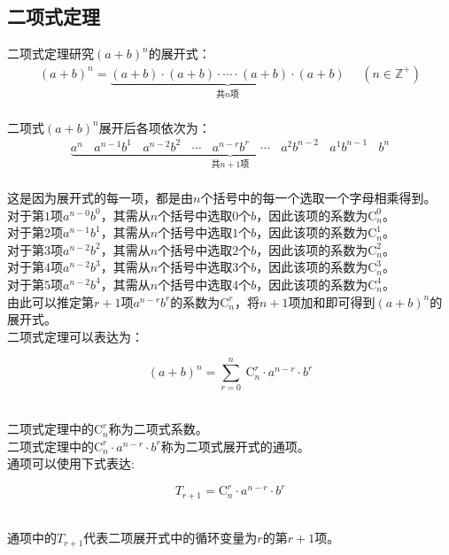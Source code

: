 \documentclass[UTF8]{ctexart}
\newcommand{\Co}{\mathrm{C}}
\begin{document}
\newpage

\subsection{二项式定理}
    \setcounter{equation}{0}
    二项式定理研究$(a+b)^n$的展开式：
    \begin{align}
        (a+b)^n=\underbrace{(a+b)\cdot(a+b)\cdot\cdots\cdot(a+b)\cdot(a+b)}_{\text{共}n\text{项}}~~~~~~(n\in\mathbb{Z^+})
    \end{align}\\
    二项式$(a+b)^n$展开后各项依次为：
    \begin{align}
        \underbrace{a^{n}~~~~a^{n-1}b^1~~~~a^{n-2}b^2~~~~\cdots~~~~a^{n-r}b^r~~~~\cdots~~~~a^2b^{n-2}~~~~a^1b^{n-1}~~~~b^{n}}_{\text{共}n+1\text{项}}
    \end{align}\\
    这是因为展开式的每一项，都是由$n$个括号中的每一个选取一个字母相乘得到。\\[3mm]
    对于第$1$项$a^{n-0}b^0$，其需从$n$个括号中选取$0$个$b$，因此该项的系数为$\Co_n^0$。\\[3mm]
    对于第$2$项$a^{n-1}b^1$，其需从$n$个括号中选取$1$个$b$，因此该项的系数为$\Co_n^1$。\\[3mm]
    对于第$3$项$a^{n-2}b^2$，其需从$n$个括号中选取$2$个$b$，因此该项的系数为$\Co_n^2$。\\[3mm]
    对于第$4$项$a^{n-2}b^3$，其需从$n$个括号中选取$3$个$b$，因此该项的系数为$\Co_n^3$。\\[3mm]
    对于第$5$项$a^{n-2}b^4$，其需从$n$个括号中选取$4$个$b$，因此该项的系数为$\Co_n^4$。\\[3mm]
    由此可以推定第$r+1$项$a^{n-r}b^r$的系数为$\Co_n^r$，将$n+1$项加和即可得到$(a+b)^n$的展开式。\\[8mm]
    二项式定理可以表达为：
    \begin{large}
        \begin{equation*}
            (a+b)^n=\sum_{r=0}^{n}~\Co_n^r\cdot a^{n-r}\cdot b^r
        \end{equation*}
    \end{large}\\
    二项式定理中的$\Co_n^r$称为二项式系数。\\[3mm]
    二项式定理中的$\Co_n^r\cdot a^{n-r}\cdot b^r$称为二项式展开式的通项。\\[10mm]
    通项可以使用下式表达:
    \begin{large}
        \begin{equation*}
            T_{r+1}=\Co_n^r\cdot a^{n-r}\cdot b^r
        \end{equation*}
    \end{large}\\
    通项中的$T_{r+1}$代表二项展开式中的循环变量为$r$的第$r+1$项。
\end{document}
